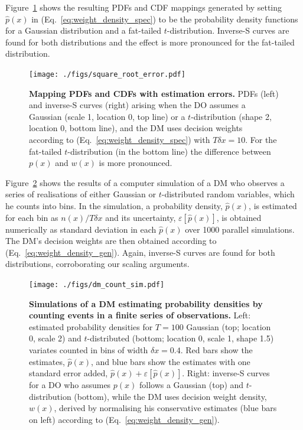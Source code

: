 \documentclass[a4paper, 12pt]{article}
\newcommand{\eref}[1]{(Eq.~\ref{eq:#1})}
\newcommand{\flabel}[1]{\label{fig:#1}}
\newcommand{\Fref}[1]{Figure~\ref{fig:#1}}
\newcommand{\err}[1]{\varepsilon\left[#1\right]}
\newcommand{\phat}{\hat{p}}
\begin{document}
\Fref{square_root_error} shows the resulting PDFs and CDF mappings generated by setting $\phat(x)$ in \eref{weight_density_spec} to be the probability density functions for a Gaussian distribution and a fat-tailed $t$-distribution. Inverse-S curves are found for both distributions and the effect is more pronounced for the fat-tailed distribution.
\begin{figure}[!htb]
\centering
\texttt{[image: ./figs/square\_root\_error.pdf]}
\caption{\textbf{Mapping PDFs and CDFs with estimation errors.} PDFs (left) and inverse-S curves (right) arising when the DO assumes a Gaussian (scale 1, location 0, top line) or a $t$-distribution (shape 2, location 0, bottom line), and the DM uses decision weights according to \eref{weight_density_spec} with $T\delta x=10$. For the fat-tailed $t$-distribution (in the bottom line) the difference between $p(x)$ and $w(x)$ is more pronounced.}
\flabel{square_root_error}
\end{figure}

\Fref{dm_count_sim} shows the results of a computer simulation of a DM who observes a series of realisations of either Gaussian or $t$-distributed random variables, which he counts into bins. In the simulation, a probability density, $\phat(x)$, is estimated for each bin as $n(x)/T\delta x$ and its uncertainty, $\err{\phat(x)}$, is obtained numerically as standard deviation in each $\phat(x)$ over 1000 parallel simulations. The DM's decision weights are then obtained according to \eref{weight_density_gen}. Again, inverse-S curves are found for both distributions, corroborating our scaling arguments.
\begin{figure}[!htb]
\centering
\texttt{[image: ./figs/dm\_count\_sim.pdf]}
\caption{\textbf{Simulations of a DM estimating probability densities by counting events in a finite series of observations.} Left: estimated probability densities for $T=100$ Gaussian (top; location 0, scale 2) and $t$-distributed (bottom; location 0, scale 1, shape 1.5) variates counted in bins of width $\delta x=0.4$. Red bars show the estimates, $\phat(x)$, and blue bars show the estimates with one standard error added, $\phat(x)+\err{\phat(x)}$. Right: inverse-S curves for a DO who assumes $p(x)$ follows a Gaussian (top) and $t$-distribution (bottom), while the DM uses decision weight density, $w(x)$, derived by normalising his conservative estimates (blue bars on left) according to \eref{weight_density_gen}.
}
\flabel{dm_count_sim}
\end{figure}
\end{document}
